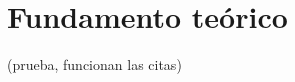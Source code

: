 \section{Fundamento teórico}

\cite{Bohren}\cite{Mishchenko}\cite{Bohren,Mishchenko} (prueba, funcionan las citas)
